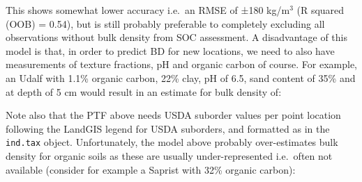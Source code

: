 \documentclass[graybox,natbib,nospthms,UStrade]{svmono}
\newenvironment{Shaded}{\begin{snugshade}}{\end{snugshade}}
\newcommand{\CommentTok}[1]{\textcolor[rgb]{0.37,0.37,0.37}{\textit{#1}}}
\newcommand{\DataTypeTok}[1]{\textcolor[rgb]{0.27,0.27,0.27}{#1}}
\newcommand{\DecValTok}[1]{\textcolor[rgb]{0.06,0.06,0.06}{#1}}
\newcommand{\FloatTok}[1]{\textcolor[rgb]{0.06,0.06,0.06}{#1}}
\newcommand{\KeywordTok}[1]{\textcolor[rgb]{0.27,0.27,0.27}{\textbf{#1}}}
\newcommand{\NormalTok}[1]{#1}
\newcommand{\OperatorTok}[1]{\textcolor[rgb]{0.43,0.43,0.43}{\textbf{#1}}}
\newcommand{\StringTok}[1]{\textcolor[rgb]{0.5,0.5,0.5}{#1}}
\begin{document}
This shows somewhat lower accuracy i.e.~an RMSE of ±180 kg/m\(^3\) (R squared (OOB) = 0.54), but is still probably preferable to completely excluding all observations without bulk density from SOC assessment. A disadvantage of this model is that, in order to predict BD for new locations, we need to also have measurements of texture fractions, pH and organic carbon of course. For example, an Udalf with 1.1\% organic carbon, 22\% clay, pH of 6.5, sand content of 35\% and at depth of 5 cm would result in an estimate for bulk density of:

\begin{Shaded}
\end{Shaded}

Note also that the PTF above needs USDA suborder values per point location following the LandGIS legend for USDA suborders, and formatted as in the \texttt{ind.tax} object. Unfortunately, the model above probably over-estimates bulk density for organic soils as these are usually under-represented i.e.~often not available (consider for example a Saprist with 32\% organic carbon):

\begin{Shaded}
\end{Shaded}
\end{document}
